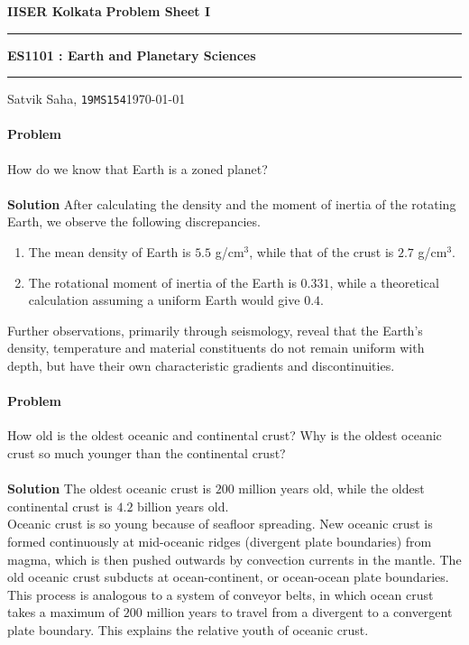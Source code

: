 \documentclass[10pt]{article}
\newcounter{prob}
\def\problem{\stepcounter{prob}\paragraph{Problem \arabic{prob}}}
\def\solution{\\\\\textbf{Solution }}
\begin{document}
        \par\textbf{IISER Kolkata} \hfill \textbf{Problem Sheet I}
        \vspace{3pt}
        \hrule
        \vspace{3pt}
        \begin{center}
                \LARGE{\textbf{ES1101 : Earth and Planetary Sciences}}
        \end{center}
        \vspace{3pt}
        \hrule
        \vspace{3pt}
        Satvik Saha, \texttt{19MS154}\hfill\today
        \vspace{20pt}

        \problem How do we know that Earth is a zoned planet?
        \solution
        After calculating the density and the moment of inertia of the rotating Earth, we observe the following discrepancies.
        \begin{enumerate}[itemsep=0pt, topsep=\parsep]
                \item The mean density of Earth is $5.5$ g/cm$^{3}$, while that of the crust is $2.7$ g/cm$^3$.
                \item The rotational moment of inertia of the Earth is $0.331$, while a theoretical calculation assuming a uniform Earth
                would give $0.4$.
        \end{enumerate}
        Further observations, primarily through seismology, reveal that the Earth's density, temperature and material constituents
        do not remain uniform with depth, but have their own characteristic gradients and discontinuities.

        \problem How old is the oldest oceanic and continental crust? Why is the oldest oceanic crust so much younger than the continental crust?
        \solution
        The oldest oceanic crust is $200$ million years old, while the oldest continental crust is $4.2$ billion years old.\\
        
        Oceanic crust is so young because of seafloor spreading. New oceanic crust is formed continuously at mid-oceanic ridges
        (divergent plate boundaries) from magma, which is then pushed outwards by convection currents in the mantle. The old oceanic
        crust subducts at ocean-continent, or ocean-ocean plate boundaries. This process is analogous to a system of conveyor belts, in which
        ocean crust takes a maximum of $200$ million years to travel from a divergent to a convergent plate boundary. This explains
        the relative youth of oceanic crust.
\end{document}
